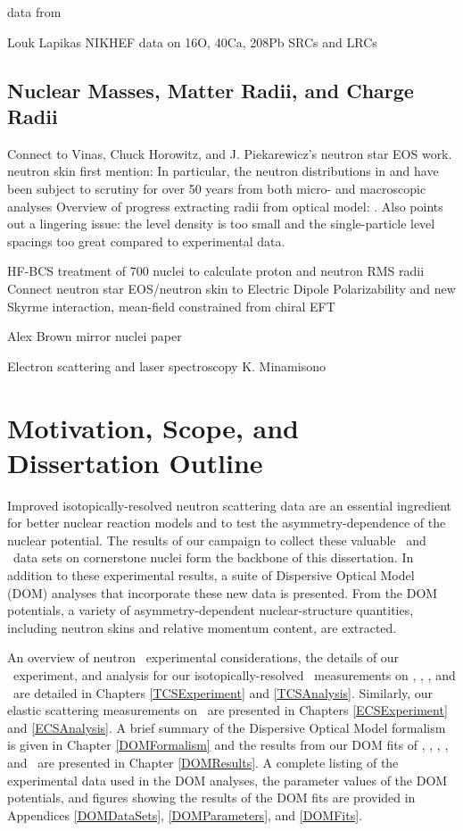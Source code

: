 \oSix data from \cite{Leuschner1994}

Louk Lapikas
NIKHEF data on 16O, 40Ca, 208Pb
SRCs and LRCs

\subsection{Nuclear Masses, Matter Radii, and Charge Radii}
Connect to Vinas, Chuck Horowitz, and J. Piekarewicz's neutron star EOS work.
neutron skin first mention: \cite{Wilkinson1967}
In particular, the neutron distributions in \caAughtEight and \pbEight have been
subject to scrutiny for over 50 years from both micro- and macroscopic analyses
Overview of progress extracting radii from optical model: \cite{Jackson1974}.
Also points out a lingering issue: the level density is too small and the
single-particle level spacings too great compared to experimental data.

HF-BCS treatment of 700 nuclei to calculate proton and neutron RMS radii \cite{Angeli1980}
Connect neutron star EOS/neutron skin to Electric Dipole Polarizability and new Skyrme interaction, mean-field
constrained from chiral EFT \cite{Zhang2018}


Alex Brown mirror nuclei paper

Electron scattering and laser spectroscopy
K. Minamisono

\section{Motivation, Scope, and Dissertation Outline}
Improved isotopically-resolved neutron scattering data are an essential ingredient
for better nuclear reaction models and to test the asymmetry-dependence of the
nuclear potential. The results of our campaign to collect these valuable
\tot\ and \el\ data sets on cornerstone nuclei form the backbone of this dissertation.
In addition to these experimental results, a suite of Dispersive Optical Model (DOM) analyses that 
incorporate these new data is presented. From the DOM potentials, a variety of asymmetry-dependent 
nuclear-structure quantities, including neutron skins and relative momentum
content, are extracted.

An overview of neutron \tot\ experimental considerations, the details of our 
\tot\ experiment, and analysis for our isotopically-resolved \tot\ measurements
on \oSixEight, \niEightFour, \rhThree, and \snTwelveFour\ are detailed in 
Chapters \ref{TCSExperiment} and \ref{TCSAnalysis}. Similarly, our elastic scattering measurements 
on \snTwelveFour\ are presented in Chapters \ref{ECSExperiment} and \ref{ECSAnalysis}. A brief 
summary of the Dispersive Optical Model formalism is
given in Chapter \ref{DOMFormalism} and the results from our DOM fits of \oSixEight, 
\caAughtEight, \niEightFour, \snTwelveFour, and \pbEight\ are presented in Chapter \ref{DOMResults}. 
A complete listing of the experimental data used in the DOM analyses, the
parameter values of the DOM potentials, and figures showing the 
results of the DOM fits are provided in Appendices \ref{DOMDataSets},
\ref{DOMParameters}, and \ref{DOMFits}. 
